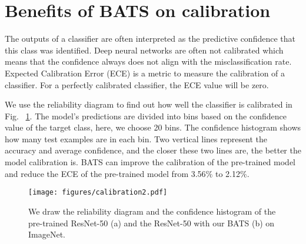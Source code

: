 \documentclass{article}
\begin{document}
{
\section{Benefits of BATS on calibration}

The outputs of a classifier are often interpreted as the predictive confidence that this class was identified. Deep neural networks are often not calibrated which means that the confidence always does not align with the misclassification rate. Expected Calibration Error (ECE) is a metric to measure the calibration of a classifier. For a perfectly calibrated classifier, the ECE value will be zero. 

We use the reliability diagram to find out how well the classifier is calibrated in Fig. ~\ref{fig:calibration}. The model's predictions are divided into bins based on the confidence value of the target class, here, we choose 20 bins. The confidence histogram shows how many test examples are in each bin. Two vertical lines represent the accuracy and average confidence, and the closer these two lines are, the better the model calibration is.  
BATS can improve the calibration of the pre-trained model and reduce the ECE of the pre-trained model from 3.56$\%$ to 2.12$\%$.

}

\begin{figure}[htbp] 
 \vskip 0.2in
 \centering
 \centerline{\texttt{[image: figures/calibration2.pdf]}}
 \caption{We draw the reliability diagram and the confidence histogram of the pre-trained ResNet-50 (a) and the ResNet-50 with our BATS (b) on ImageNet.}
 \label{fig:calibration}
 \vskip -0.2in
 \end{figure}
\end{document}
